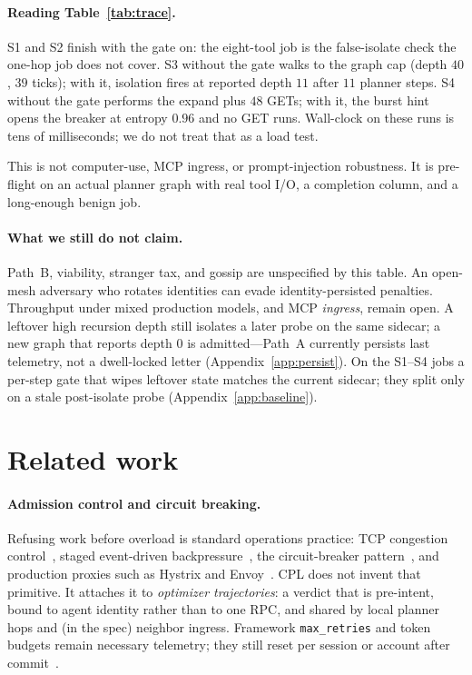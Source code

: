 \documentclass{article}
\begin{document}
\paragraph{Reading Table~\ref{tab:trace}.}
S1 and S2 finish with the gate on: the eight-tool job is the false-isolate check the one-hop job does not cover.
S3 without the gate walks to the graph cap (depth $40$, $39$ ticks); with it, isolation fires at reported depth $11$ after $11$ planner steps.
S4 without the gate performs the expand plus $48$ GETs; with it, the burst hint opens the breaker at entropy $0.96$ and no GET runs.
Wall-clock on these runs is tens of milliseconds; we do not treat that as a load test.

This is not computer-use, MCP ingress, or prompt-injection robustness.
It is pre-flight on an actual planner graph with real tool I/O, a completion column, and a long-enough benign job.

\paragraph{What we still do not claim.}
Path~B, viability, stranger tax, and gossip are unspecified by this table.
An open-mesh adversary who rotates identities can evade identity-persisted penalties.
Throughput under mixed production models, and MCP \emph{ingress}, remain open.
A leftover high recursion depth still isolates a later probe on the same sidecar; a new graph that reports depth $0$ is admitted---Path~A currently persists last telemetry, not a dwell-locked letter (Appendix~\ref{app:persist}).
On the S1--S4 jobs a per-step gate that wipes leftover state matches the current sidecar; they split only on a stale post-isolate probe (Appendix~\ref{app:baseline}).

\section{Related work}
\label{sec:related}

\paragraph{Admission control and circuit breaking.}
Refusing work before overload is standard operations practice: TCP congestion control~\cite{jacobson1988congestion}, staged event-driven backpressure~\cite{welsh2001seda}, the circuit-breaker pattern~\cite{nygard2018release,fowler2014circuit}, and production proxies such as Hystrix and Envoy~\cite{netflix2012hystrix,envoy2024circuit}.
CPL does not invent that primitive.
It attaches it to \emph{optimizer trajectories}: a verdict that is pre-intent, bound to agent identity rather than to one RPC, and shared by local planner hops and (in the spec) neighbor ingress.
Framework \texttt{max\_retries} and token budgets remain necessary telemetry; they still reset per session or account after commit~\cite{cemri2025why}.
\end{document}
